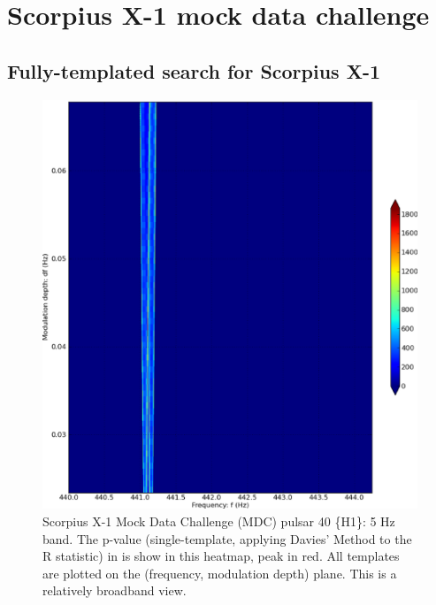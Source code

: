 

\section{Scorpius X-1 mock data challenge}
\subsection{Fully-templated search for Scorpius X-1}


\begin{figure}
\begin{center}
\includegraphics[width=0.8\paperwidth,height=0.62\paperheight]{bandH1-bold.eps}


\caption{
Scorpius X-1 Mock Data Challenge (MDC) pulsar 40 \{H1\}: 5 Hz band. 
The p-value (single-template, applying Davies' Method to the R statistic) in is show in this heatmap, peak in red. 
All templates are plotted on the (frequency, modulation depth) plane.
This is a relatively broadband view.
}
\end{center}
\end{figure}


